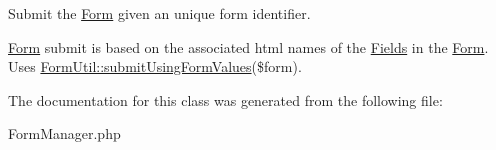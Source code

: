 Submit the \hyperlink{class_form}{Form} given an unique form identifier. 

\hyperlink{class_form}{Form} submit is based on the associated html names of the \hyperlink{class_fields}{Fields} in the \hyperlink{class_form}{Form}. Uses \hyperlink{class_form_util_ac7c187cc47890d73a4d33ab38400f3e9}{Form\-Util\-::submit\-Using\-Form\-Values}(\$form). 

The documentation for this class was generated from the following file\-:\begin{DoxyCompactItemize}
\item 
Form\-Manager.\-php\end{DoxyCompactItemize}
